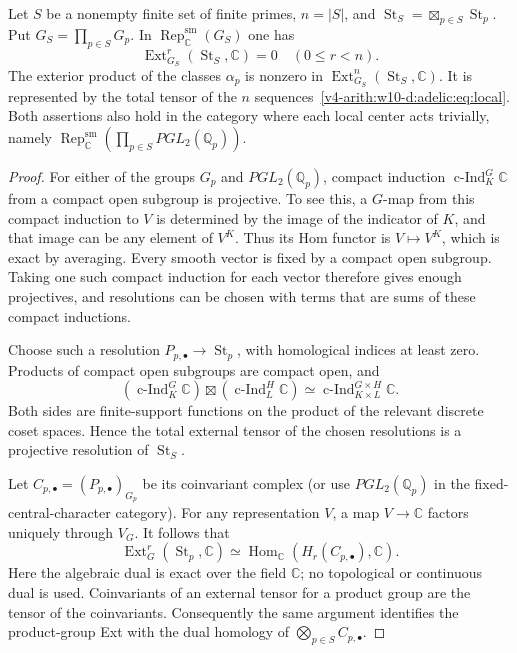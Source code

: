 \begin{proposition}\label{v4-arith:w10-d:adelic:prop:finite}
Let $S$ be a nonempty finite set of finite primes, $n=|S|$, and
$\operatorname{St}_S=\boxtimes_{p\in S}\operatorname{St}_p$. Put $G_S=\prod_{p\in S}G_p$.
In $\operatorname{Rep}^{\mathrm{sm}}_{\mathbb C}(G_S)$ one has
\[
 \operatorname{Ext}^r_{G_S}(\operatorname{St}_S,\mathbb C)=0\quad(0\le r<n).
\]
The exterior product of the classes $\alpha_p$ is nonzero in
$\operatorname{Ext}^n_{G_S}(\operatorname{St}_S,\mathbb C)$. It is represented by the total tensor
of the $n$ sequences~\eqref{v4-arith:w10-d:adelic:eq:local}.
Both assertions also hold in the category where each local center acts
trivially, namely $\operatorname{Rep}^{\mathrm{sm}}_{\mathbb C}(\prod_{p\in S}PGL_2(\mathbb Q_p))$.
\end{proposition}
\begin{proof}
For either of the groups $G_p$ and $PGL_2(\mathbb Q_p)$, compact induction
$\operatorname{c-Ind}_K^G\mathbb C$ from a compact open subgroup is projective. To see this,
a $G$-map from this compact induction to $V$ is determined by the image
of the indicator of $K$, and that image can be any element of $V^K$.
Thus its Hom functor is $V\mapsto V^K$, which is exact by averaging.
Every smooth vector is fixed by a compact open subgroup. Taking one
such compact induction for each vector therefore gives enough projectives,
and resolutions can be chosen with terms that are sums of these
compact inductions.

Choose such a resolution $P_{p,\bullet}\to\operatorname{St}_p$, with homological
indices at least zero. Products of compact open subgroups are compact
open, and
\[
 \left(\operatorname{c-Ind}_K^G\mathbb C\right)\boxtimes
 \left(\operatorname{c-Ind}_L^H\mathbb C\right)
 \simeq\operatorname{c-Ind}_{K\times L}^{G\times H}\mathbb C.
\]
Both sides are finite-support functions on the product of the relevant
discrete coset spaces. Hence the total external tensor of the chosen
resolutions is a projective resolution of $\operatorname{St}_S$.

Let $C_{p,\bullet}=(P_{p,\bullet})_{G_p}$ be its coinvariant complex
(or use $PGL_2(\mathbb Q_p)$ in the fixed-central-character category).
For any representation $V$, a map $V\to\mathbb C$ factors uniquely through
$V_G$. It follows that
\begin{equation}\label{v4-arith:w10-d:adelic:eq:coinvariant}
 \operatorname{Ext}^r_G(\operatorname{St}_p,\mathbb C)
 \simeq\operatorname{Hom}_{\mathbb C}(H_r(C_{p,\bullet}),\mathbb C).
\end{equation}
Here the algebraic dual is exact over the field $\mathbb C$; no topological
or continuous dual is used. Coinvariants of an external tensor for a
product group are the tensor of the coinvariants. Consequently the same
argument identifies the product-group Ext with the dual homology of
$\bigotimes_{p\in S}C_{p,\bullet}$.


\end{proof}
